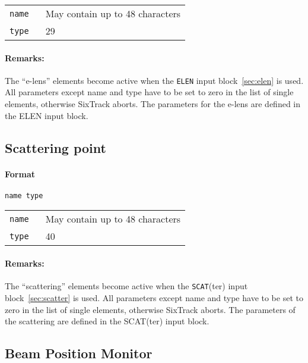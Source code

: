 \bigskip
\begin{tabular}{@{}lp{0.8\linewidth}}
    \texttt{name} & May contain up to 48 characters \\
    \texttt{type} & 29
\end{tabular}

\paragraph{Remarks:}
The ``e-lens'' elements become active when the \texttt{ELEN} input block~\ref{sec:elen} is used.
All parameters except name and type have to be set to zero in the list of single elements, otherwise SixTrack aborts.
The parameters for the e-lens are defined in the ELEN input block.

\subsection{Scattering point} \label{SCAT}

\paragraph{Format} \texttt{name type}

\bigskip
\begin{tabular}{@{}lp{0.8\linewidth}}
    \texttt{name} & May contain up to 48 characters \\
    \texttt{type} & 40
\end{tabular}

\paragraph{Remarks:}
The ``scattering'' elements become active when the \texttt{SCAT}(ter) input block~\ref{sec:scatter} is used.
All parameters except name and type have to be set to zero in the list of single elements, otherwise SixTrack aborts.
The parameters of the scattering are defined in the SCAT(ter) input block.

\subsection{Beam Position Monitor} \label{BPM}

